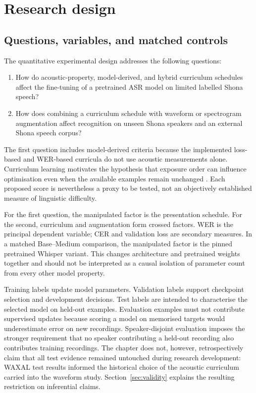 \documentclass[12pt,a4paper]{report}
\begin{document}
\section{Research design}
\label{sec:design}

\subsection{Questions, variables, and matched controls}

The quantitative experimental design addresses the following questions:
\begin{enumerate}
\item How do acoustic-property, model-derived, and hybrid curriculum schedules affect the fine-tuning of a pretrained ASR model on limited labelled Shona speech?
\item How does combining a curriculum schedule with waveform or spectrogram augmentation affect recognition on unseen Shona speakers and an external Shona speech corpus?
\end{enumerate}
The first question includes model-derived criteria because the implemented loss-based and WER-based curricula do not use acoustic measurements alone. Curriculum learning motivates the hypothesis that exposure order can influence optimisation even when the available examples remain unchanged \citep{Bengio2009}. Each proposed score is nevertheless a proxy to be tested, not an objectively established measure of linguistic difficulty.

For the first question, the manipulated factor is the presentation schedule. For the second, curriculum and augmentation form crossed factors. WER is the principal dependent variable; CER and validation loss are secondary measures. In a matched Base--Medium comparison, the manipulated factor is the pinned pretrained Whisper variant. This changes architecture and pretrained weights together and should not be interpreted as a causal isolation of parameter count from every other model property.

Training labels update model parameters. Validation labels support checkpoint selection and development decisions. Test labels are intended to characterise the selected model on held-out examples. Evaluation examples must not contribute supervised updates because scoring a model on memorised targets would underestimate error on new recordings. Speaker-disjoint evaluation imposes the stronger requirement that no speaker contributing a held-out recording also contributes training recordings. The chapter does not, however, retrospectively claim that all test evidence remained untouched during research development: WAXAL test results informed the historical choice of the acoustic curriculum carried into the waveform study. Section~\ref{sec:validity} explains the resulting restriction on inferential claims.
\end{document}
